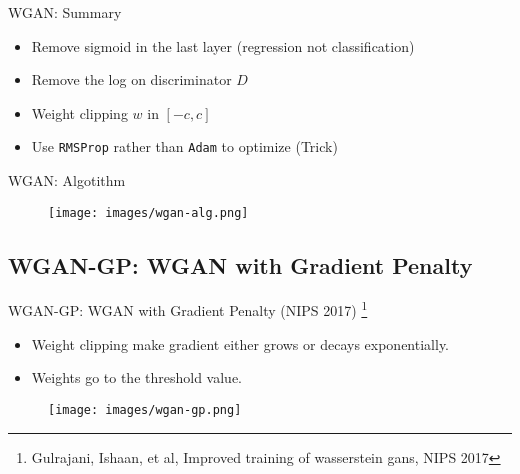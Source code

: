 \documentclass[handout]{beamer}
\begin{document}
\begin{frame}[<+->]{WGAN: Summary}
	\begin{itemize}
		\item Remove sigmoid in the last layer (regression not classification)
		\item Remove the log on discriminator $D$
		\item Weight clipping $w$ in $[-c, c]$
		\item Use \texttt{RMSProp} rather than \texttt{Adam} to optimize (Trick)
	\end{itemize}
\end{frame}

\begin{frame}{WGAN: Algotithm}
	\begin{figure}
		\centering
		\texttt{[image: images/wgan-alg.png]}
	\end{figure}
\end{frame}

\subsection{WGAN-GP: WGAN with Gradient Penalty}

\begin{frame}[<+->]{WGAN-GP: WGAN with Gradient Penalty (NIPS 2017) \footnote{Gulrajani, Ishaan, et al, Improved training of wasserstein gans, NIPS 2017}}
	\begin{itemize}
		\item Weight clipping make gradient either grows or decays exponentially.
		\item Weights go to the threshold value. 
	\end{itemize}
	\begin{actionenv}
		\begin{figure}
			\centering
			\texttt{[image: images/wgan-gp.png]}
		\end{figure}
	\end{actionenv}
\end{frame}
\end{document}

